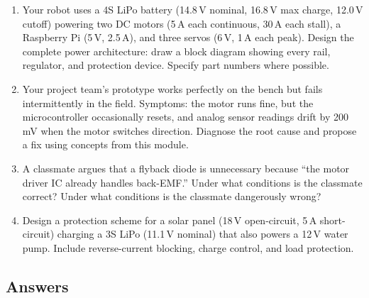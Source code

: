 \documentclass[11pt,letterpaper,twoside,openany]{book}
\begin{document}
\begin{enumerate}[resume,leftmargin=1.5em]
  \item Your robot uses a 4S LiPo battery (14.8\,V nominal, 16.8\,V max charge, 12.0\,V cutoff) powering two DC motors (5\,A each continuous, 30\,A each stall), a Raspberry Pi (5\,V, 2.5\,A), and three servos (6\,V, 1\,A each peak). Design the complete power architecture: draw a block diagram showing every rail, regulator, and protection device. Specify part numbers where possible.

  \item Your project team's prototype works perfectly on the bench but fails intermittently in the field. Symptoms: the motor runs fine, but the microcontroller occasionally resets, and analog sensor readings drift by 200\,mV when the motor switches direction. Diagnose the root cause and propose a fix using concepts from this module.

  \item A classmate argues that a flyback diode is unnecessary because ``the motor driver IC already handles back-EMF.'' Under what conditions is the classmate correct? Under what conditions is the classmate dangerously wrong?

  \item Design a protection scheme for a solar panel (18\,V open-circuit, 5\,A short-circuit) charging a 3S LiPo (11.1\,V nominal) that also powers a 12\,V water pump. Include reverse-current blocking, charge control, and load protection.
\end{enumerate}

\subsection{Answers}
\end{document}
